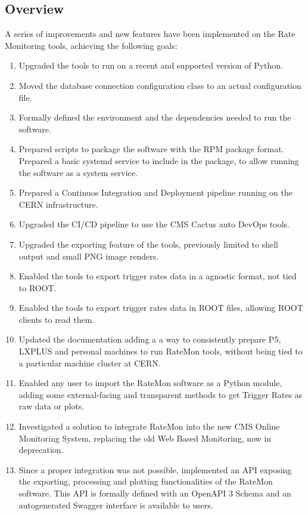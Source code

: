 \subsection{Overview}

A series of improvements and new features have been implemented on the Rate Monitoring tools, achieving the following goals:

\begin{enumerate}

\item Upgraded the tools to run on a recent and supported version of Python.
\item Moved the database connection configuration class to an actual configuration file.
\item Formally defined the environment and the dependencies needed to run the software.
\item Prepared scripts to package the software with the RPM package format. Prepared a basic systemd service to include in the package, to allow running the software as a system service.
\item Prepared a Continuos Integration and Deployment pipeline running on the CERN infrastructure.
\item Upgraded the CI/CD pipeline to use the CMS Cactus auto DevOps tools.
\item Upgraded the exporting feature of the tools, previously limited to shell output and small PNG image renders.
\item Enabled the tools to export trigger rates data in a agnostic format, not tied to ROOT.
\item Enabled the tools to export trigger rates data in ROOT files, allowing ROOT clients to read them.
\item Updated the documentation adding a a way to consistently prepare P5, LXPLUS and personal machines to run RateMon tools, without being tied to a particular machine cluster at CERN.
\item Enabled any user to import the RateMon software as a Python module, adding some external-facing and transparent methods to get Trigger Rates as raw data or plots.
\item Investigated a solution to integrate RateMon into the new CMS Online Monitoring System, replacing the old Web Based Monitoring, now in deprecation.
\item Since a proper integration was not possible, implemented an API exposing the exporting, processing and plotting functionalities of the RateMon software. This API is formally defined with an OpenAPI 3 Schema and an autogenerated Swagger interface is available to users.

\end{enumerate}
